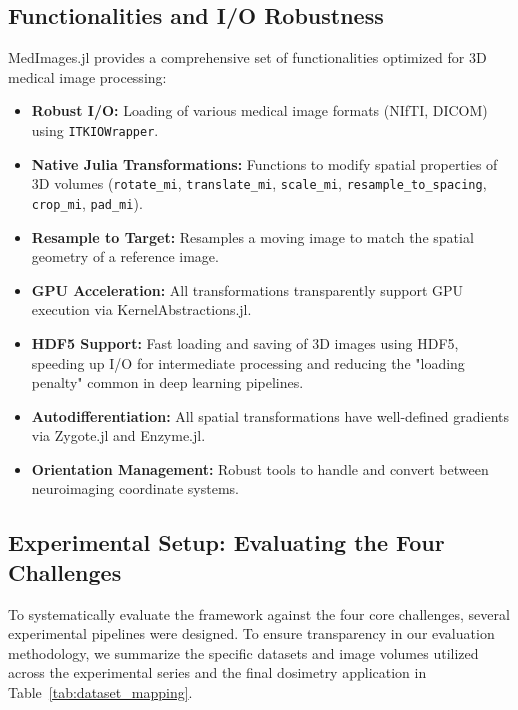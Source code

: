 \documentclass[10pt,letterpaper]{article}
\begin{document}
\subsection*{Functionalities and I/O Robustness}
MedImages.jl provides a comprehensive set of functionalities optimized for 3D medical image processing:
\begin{itemize}
    \item \textbf{Robust I/O:} Loading of various medical image formats (NIfTI, DICOM) using \texttt{ITKIOWrapper}.
    \item \textbf{Native Julia Transformations:} Functions to modify spatial properties of 3D volumes (\texttt{rotate\_mi}, \texttt{translate\_mi}, \texttt{scale\_mi}, \texttt{resample\_to\_spacing}, \texttt{crop\_mi}, \texttt{pad\_mi}).
    \item \textbf{Resample to Target:} Resamples a moving image to match the spatial geometry of a reference image.
    \item \textbf{GPU Acceleration:} All transformations transparently support GPU execution via KernelAbstractions.jl.
    \item \textbf{HDF5 Support:} Fast loading and saving of 3D images using HDF5, speeding up I/O for intermediate processing and reducing the "loading penalty" common in deep learning pipelines.
    \item \textbf{Autodifferentiation:} All spatial transformations have well-defined gradients via Zygote.jl and Enzyme.jl.
    \item \textbf{Orientation Management:} Robust tools to handle and convert between neuroimaging coordinate systems.
\end{itemize}

\subsection*{Experimental Setup: Evaluating the Four Challenges}
To systematically evaluate the framework against the four core challenges, several experimental pipelines were designed. To ensure transparency in our evaluation methodology, we summarize the specific datasets and image volumes utilized across the experimental series and the final dosimetry application in Table~\ref{tab:dataset_mapping}.
\end{document}
